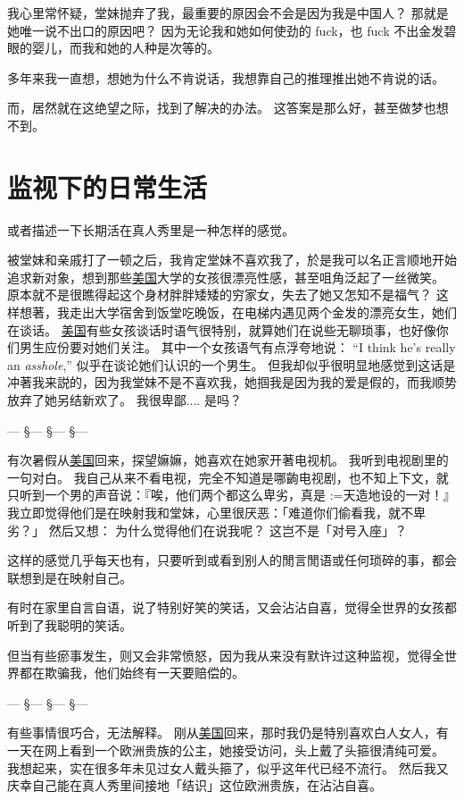 \documentclass[12pt]{report}
\makeatletter
\renewcommand{\d}[1]{$\underaccent{\scalebox{0.5}{\textbullet}}{\textrm{#1}}$}
\newcommand{\ds}[1]{%
  \@tfor\next:=#1\do{\d{\next}}}
\newcommand*\vignette{\begin{center}\color{blue}  --- \quad \S \quad --- \quad \S \quad --- \quad \S \quad --- \end{center}}
\makeatother
\begin{document}
我心里常怀疑，堂妹抛弃了我，最重要的原因会不会是因为我是中国人？ 那就是她唯一说不出口的原因吧？  因为无论我和她如何使劲的 fuck，也 fuck 不出金发碧眼的婴儿，而我和她的人种是次等的。

多年来我一直想，想她为什么不肯说话，我想靠自己的推理推出她不肯说的话。

而，居然就在这绝望之际，找到了解决的办法。 这答案是那么好，甚至做梦也想不到。

\chapter{监视下的日常生活}

或者描述一下长期活在真人秀里是一种怎样的感觉。 

被堂妹和亲戚打了一顿之后，我肯定堂妹不喜欢我了，於是我可以名正言顺地开始追求新对象，想到那些\underline{美国}大学的女孩很漂亮性感，甚至咀角泛起了一丝微笑。  原本就不是很瞧得起这个身材胖胖矮矮的穷家女，失去了她又怎知不是福气？  这样想著，我走出大学宿舍到饭堂吃晚饭，在电梯内遇见两个金发的漂亮女生，她们在谈话。 \underline{美国}有些女孩谈话时语气很特别，就算她们在说些无聊琐事，也好像你们男生应份要对她们关注。 其中一个女孩语气有点浮夸地说： ``I think he's really an \textit{asshole},'' 似乎在谈论她们认识的一个男生。  但我却似乎很明显地感觉到这话是冲著我来説的，因为我堂妹不是不喜欢我，她掴我是因为我的爱是假的，而我顺势放弃了她另结新欢了。 我很卑鄙.... 是吗？

\vignette

有次暑假从\underline{美国}回来，探望嫲嫲，她喜欢在她家开著电视机。 我听到电视剧里的一句对白。  我自己从来不看电视，完全不知道是哪齣电视剧，也不知上下文，就只听到一个男的声音说：『唉，他们两个都这么卑劣，真是\ds{天造地设}的一对！』  我立即觉得他们是在映射我和堂妹，心里很厌恶：「难道你们偷看我，就不卑劣？」  然后又想： 为什么觉得他们在说我呢？  这岂不是「对号入座」？

这样的感觉几乎每天也有，只要听到或看到别人的閒言閒语或任何琐碎的事，都会联想到是在映射自己。 

有时在家里自言自语，说了特别好笑的笑话，又会沾沾自喜，觉得全世界的女孩都听到了我聪明的笑话。

但当有些瘀事发生，则又会非常愤怒，因为我从来没有默许过这种监视，觉得全世界都在欺骗我，他们始终有一天要赔偿的。

\vignette

有些事情很巧合，无法解释。  刚从\underline{美国}回来，那时我仍是特别喜欢白人女人，有一天在网上看到一个欧洲贵族的公主，她接受访问，头上戴了头箍很清纯可爱。  我想起来，实在很多年未见过女人戴头箍了，似乎这年代已经不流行。  然后我又庆幸自己能在真人秀里间接地「结识」这位欧洲贵族，在沾沾自喜。
\end{document}
